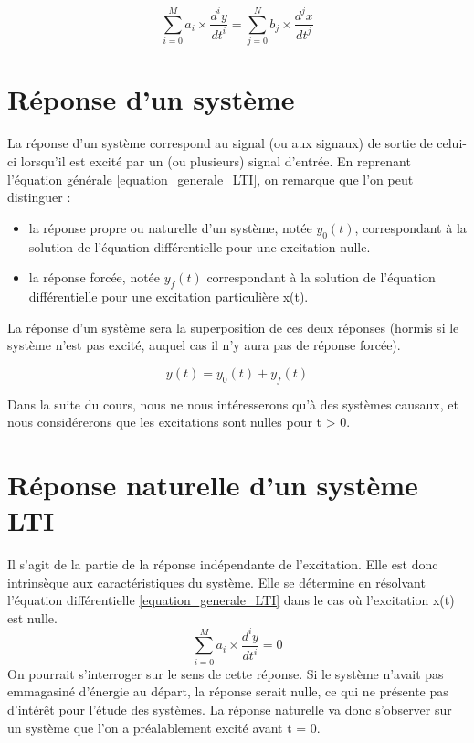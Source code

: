 \documentclass[]{report}
\begin{document}
	\begin{equation}\label{equation_generale_LTI}
	\sum_{i=0}^M a_{i}\times \frac{d^{i}y}{dt^{i}} = \sum_{j=0}^N b_{j}\times \frac{d^{j}x}{dt^{j}}
	\end{equation}
	
	
	\section{Réponse d'un système}
	La réponse d'un système correspond au signal (ou aux signaux) de sortie de celui-ci lorsqu'il est excité par un (ou plusieurs) signal d'entrée. En reprenant l'équation générale \ref{equation_generale_LTI}, on remarque que l'on peut distinguer :
	\begin{itemize}
		\item la réponse propre ou naturelle d'un système, notée $y_{0}(t)$, correspondant à la solution de l'équation différentielle pour une excitation nulle.
		\item la réponse forcée, notée $y_{f}(t)$ correspondant à la solution de l'équation différentielle pour une excitation particulière x(t).
	\end{itemize}
	
	La réponse d'un système sera la superposition de ces deux réponses (hormis si le système n'est pas excité, auquel cas il n'y aura pas de réponse forcée).
	
	\begin{equation}
	y(t) = y_{0}(t)+y_{f}(t)
	\end{equation}
	
	Dans la suite du cours, nous ne nous intéresserons qu'à des systèmes causaux,  et nous considérerons que les excitations sont nulles pour t > 0.
	
	\section{Réponse naturelle d'un système LTI}
	Il s'agit de la partie de la réponse indépendante de l'excitation. Elle est donc intrinsèque aux caractéristiques du système. Elle se détermine en résolvant l'équation différentielle \ref{equation_generale_LTI} dans le cas où l'excitation x(t) est nulle.
	\begin{equation}\label{equa_diff_reponse_naturelle}
	\sum_{i=0}^M a_{i}\times \frac{d^{i}y}{dt^{i}} = 0
	\end{equation}
	On pourrait s'interroger sur le sens de cette réponse. Si le système n'avait pas emmagasiné d'énergie au départ, la réponse serait nulle, ce qui ne présente pas d'intérêt pour l'étude des systèmes. La réponse naturelle va donc s'observer sur un système que l'on a préalablement excité avant t = 0.  
	
\end{document}
